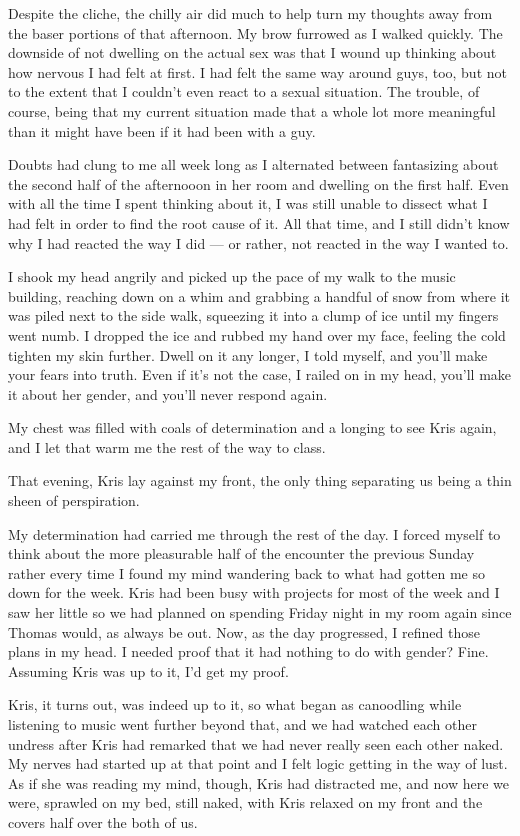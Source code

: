 Despite the cliche, the chilly air did much to help turn my thoughts away from the baser portions of that afternoon.  My brow furrowed as I walked quickly.  The downside of not dwelling on the actual sex was that I wound up thinking about how nervous I had felt at first.  I had felt the same way around guys, too, but not to the extent that I couldn't even react to a sexual situation.  The trouble, of course, being that my current situation made that a whole lot more meaningful than it might have been if it had been with a guy.

Doubts had clung to me all week long as I alternated between fantasizing about the second half of the afternooon in her room and dwelling on the first half.  Even with all the time I spent thinking about it, I was still unable to dissect what I had felt in order to find the root cause of it.  All that time, and I still didn't know why I had reacted the way I did --- or rather, not reacted in the way I wanted to.

I shook my head angrily and picked up the pace of my walk to the music building, reaching down on a whim and grabbing a handful of snow from where it was piled next to the side walk, squeezing it into a clump of ice until my fingers went numb.  I dropped the ice and rubbed my hand over my face, feeling the cold tighten my skin further.  Dwell on it any longer, I told myself, and you'll make your fears into truth.  Even if it's not the case, I railed on in my head, you'll make it about her gender, and you'll never respond again.

My chest was filled with coals of determination and a longing to see Kris again, and I let that warm me the rest of the way to class.

That evening, Kris lay against my front, the only thing separating us being a thin sheen of perspiration.

My determination had carried me through the rest of the day.  I forced myself to think about the more pleasurable half of the encounter the previous Sunday rather every time I found my mind wandering back to what had gotten me so down for the week.  Kris had been busy with projects for most of the week and I saw her little so we had planned on spending Friday night in my room again since Thomas would, as always be out.  Now, as the day progressed, I refined those plans in my head.  I needed proof that it had nothing to do with gender?  Fine.  Assuming Kris was up to it, I'd get my proof.

Kris, it turns out, was indeed up to it, so what began as canoodling while listening to music went further beyond that, and we had watched each other undress after Kris had remarked that we had never really seen each other naked.  My nerves had started up at that point and I felt logic getting in the way of lust.  As if she was reading my mind, though, Kris had distracted me, and now here we were, sprawled on my bed, still naked, with Kris relaxed on my front and the covers half over the both of us.

